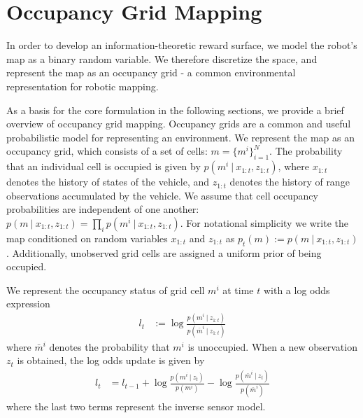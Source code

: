 \section{Occupancy Grid Mapping}
\label{sec:occupancy_grid_mapping}

In order to develop an information-theoretic reward surface, we model the
robot's map as a binary random variable. We therefore discretize the space, and
represent the map as an occupancy grid - a common environmental representation
for robotic mapping.

As a basis for the core formulation in the following sections, we provide a brief overview of occupancy grid mapping. Occupancy grids are a common and useful probabilistic model for representing an environment.
We represent the map as an occupancy grid, which consists of a set of cells: $m = \{m^{i}\}_{i=1}^{N}$.
The probability that an individual cell is occupied is given by $p\left(m^{i} \ \vert \ x_{1:t}, z_{1:t}\right)$, where $x_{1:t}$ denotes the history of states of the vehicle, and $z_{1:t}$ denotes the history of range observations accumulated by the vehicle.
We assume that cell occupancy probabilities are independent of one another: $p\left(m \ \vert \ x_{1:t}, z_{1:t}\right) = \prod_{i} p\left(m^{i} \ \vert \ x_{1:t}, z_{1:t}\right)$.
For notational simplicity we write the map conditioned on random variables $x_{1:t}$ and $z_{1:t}$ as $p_{t}\left(m\right) := p\left(m \ \vert \ x_{1:t}, z_{1:t}\right)$.
Additionally, unobserved grid cells are assigned a uniform prior of being occupied.

We represent the occupancy status of grid cell $m^i$ at time $t$ with a log odds expression
\begin{align}
  l_t &:= \log \frac{p \left( m^i \ \vert \ z_{1:t} \right)}{p \left( \bar{m}^i \ \vert \ z_{1:t} \right)}
\end{align}
where $\bar{m}^i$ denotes the probability that $m^i$ is unoccupied.
When a new observation $z_t$ is obtained, the log odds update is given by
\begin{align}
  l_t &= l_{t-1} + \log \frac{p\left( m^i \ \vert \ z_t \right)}{p \left( m^i \right)} - \log \frac{p\left( \bar{m}^i \ \vert \ z_t \right)}{p \left(\bar{m}^i \right)}
  \label{eq:logodds_update}
\end{align}
where the last two terms represent the inverse sensor model.
